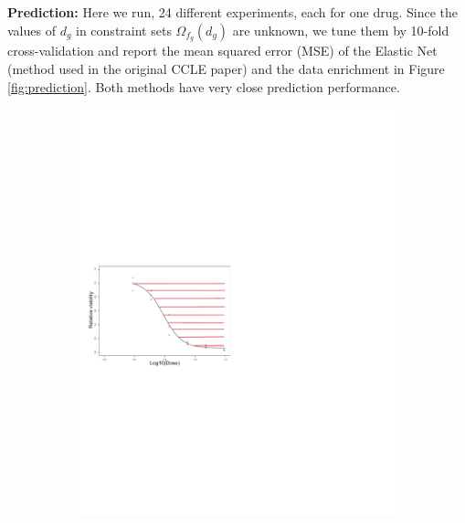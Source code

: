 {\bf Prediction:} Here we run, 24 different experiments, each for one drug.  %
Since the values of $d_g$  in constraint sets $\Omega_{f_g}(d_g)$  are unknown, we tune them by 10-fold cross-validation and report the mean squared error (MSE) of the Elastic Net \cite{zoha05} (method used in the original CCLE paper\cite{barretina2012cancer}) and the data enrichment in Figure \ref{fig:prediction}. Both methods have very close prediction performance.
	\begin{figure}
	\begin{subfigure}[b]{0.32\textwidth}
		\includegraphics[width=\textwidth]{./img/dr4.pdf}
		\caption{}\label{fig:dr}
	\end{subfigure} ~
	\begin{subfigure}[b]{0.30\textwidth}

\end{subfigure}
\end{figure}
